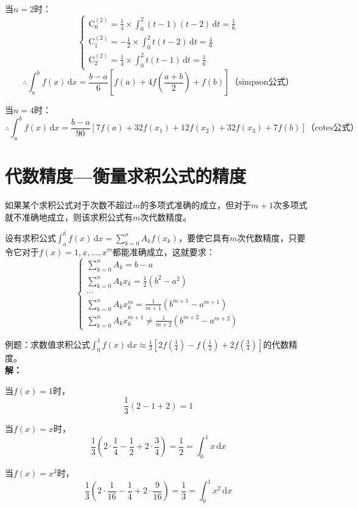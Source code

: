 \documentclass[UTF8,a4paper,11pt,oneside]{ctexbook}
\begin{document}
当\(n=2\)时：
\[
\begin{cases}
    \mathrm{C}_0^{(2)}=\frac{1}{4}\times\int_0^2(t-1)(t-2)\,\mathrm{d}t=\frac{1}{6}\\
    \mathrm{C}_1^{(2)}=-\frac{1}{2}\times\int_0^2t(t-2)\,\mathrm{d}t=\frac{4}{6}\\
    \mathrm{C}_2^{(2)}=\frac{1}{4}\times\int_0^2t(t-1)\,\mathrm{d}t=\frac{1}{6}
\end{cases}
\]
\[
\therefore\int_a^bf(x)\,\mathrm{d}x=\frac{b-a}{6}\left[f(a)+4f\left(\frac{a+b}{2}\right)+f(b)\right]\text{（simpson公式）}
\]

当\(n=4\)时：
\[
\therefore\int_a^bf(x)\,\mathrm{d}x=\frac{b-a}{90}[7f(a)+32f(x_1)+12f(x_2)+32f(x_3)+7f(b)]\text{（cotes公式）}
\]

\section{代数精度---衡量求积公式的精度}

如果某个求积公式对于次数不超过\(m\)的多项式准确的成立，但对于\(m+1\)次多项式就不准确地成立，则该求积公式有\(m\)次代数精度。

设有求积公式\(\int_a^bf(x)\,\mathrm{d}x=\sum\limits_{k=0}^nA_kf(x_k)\)，要使它具有\(m\)次代数精度，只要令它对于\(f(x)=1,x,\ldots,x^m\)都能准确成立，这就要求：
\[
\begin{cases}
    \sum\limits_{k=0}^nA_k=b-a\\
    \sum\limits_{k=0}^nA_kx_k=\frac{1}{2}(b^2-a^2)\\
    \cdots\\
    \sum\limits_{k=0}^nA_kx_k^m=\frac{1}{m+1}(b^{m+1}-a^{m+1})\\
    \sum\limits_{k=0}^nA_kx_k^{m+1}\neq\frac{1}{m+2}(b^{m+2}-a^{m+2})
\end{cases}
\]

例题：求数值求积公式\(\int_0^1f(x)\,\mathrm{d}x\approx\frac{1}{3}\left[2f\left(\frac{1}{4}\right)-f\left(\frac{1}{2}\right)+2f\left(\frac{3}{4}\right)\right]\)的代数精度。\\
\textbf{解：}

当\(f(x)=1\)时，
\[
\frac{1}{3}(2-1+2)=1
\]

当\(f(x)=x\)时，
\[
\frac{1}{3}\left(2\cdot\frac{1}{4}-\frac{1}{2}+2\cdot\frac{3}{4}\right)=\frac{1}{2}=\int_0^1x\,\mathrm{d}x
\]

当\(f(x)=x^2\)时，
\[
\frac{1}{3}\left(2\cdot\frac{1}{16}-\frac{1}{4}+2\cdot\frac{9}{16}\right)=\frac{1}{3}=\int_0^1x^2\,\mathrm{d}x
\]
\end{document}
